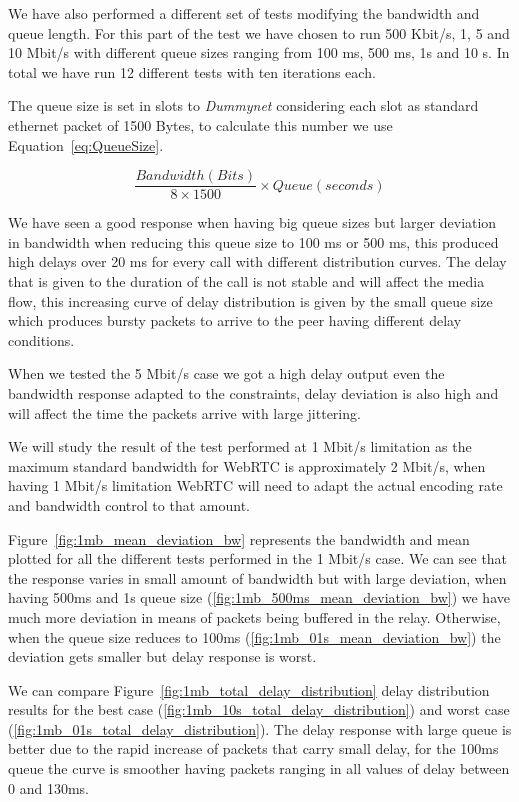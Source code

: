 We have also performed a different set of tests modifying the bandwidth and queue length. For this part of the test we have chosen to run 500 Kbit/s, 1, 5 and 10 Mbit/s with different queue sizes ranging from 100 ms, 500 ms, 1s and 10 s. In total we have run 12 different tests with ten iterations each.

The queue size is set in slots to {\it Dummynet} considering each slot as standard ethernet packet of 1500 Bytes, to calculate this number we use Equation~\ref{eq:QueueSize}.

\begin{equation}
	\frac{Bandwidth (Bits)}{8 \times 1500} \times Queue (seconds)
	\label{eq:QueueSize}
\end{equation}

We have seen a good response when having big queue sizes but larger deviation in bandwidth when reducing this queue size to 100 ms or 500 ms, this produced high delays over 20 ms for every call with different distribution curves. The delay that is given to the duration of the call is not stable and will affect the media flow, this increasing curve of delay distribution is given by the small queue size which produces bursty packets to arrive to the peer having different delay conditions.

When we tested the 5 Mbit/s case we got a high delay output even the bandwidth response adapted to the constraints, delay deviation is also high and will affect the time the packets arrive with large jittering.

We will study the result of the test performed at 1 Mbit/s limitation as the maximum standard bandwidth for WebRTC is approximately 2 Mbit/s, when having 1 Mbit/s limitation WebRTC will need to adapt the actual encoding rate and bandwidth control to that amount.

Figure~\ref{fig:1mb_mean_deviation_bw} represents the bandwidth and mean plotted for all the different tests performed in the 1 Mbit/s case. We can see that the response varies in small amount of bandwidth but with large deviation, when having 500ms and 1s queue size (\ref{fig:1mb_500ms_mean_deviation_bw}) we have much more deviation in means of packets being buffered in the relay. Otherwise, when the queue size reduces to 100ms (\ref{fig:1mb_01s_mean_deviation_bw}) the deviation gets smaller but delay response is worst.

We can compare Figure~\ref{fig:1mb_total_delay_distribution} delay distribution results for the best case (\ref{fig:1mb_10s_total_delay_distribution}) and worst case (\ref{fig:1mb_01s_total_delay_distribution}). The delay response with large queue is better due to the rapid increase of packets that carry small delay, for the 100ms queue the curve is smoother having packets ranging in all values of delay between 0 and 130ms.

